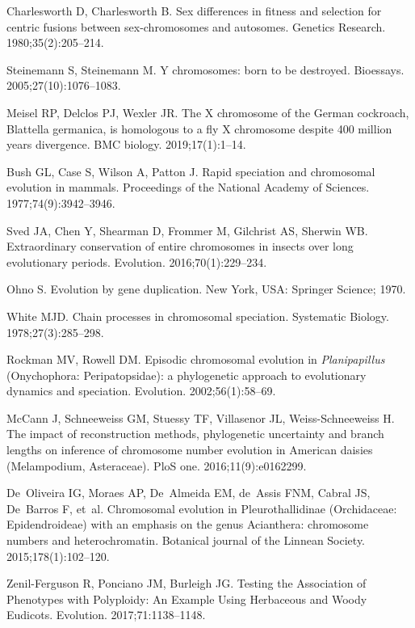 \documentclass[]{rsos}%
\begin{document}
\begin{thebibliography}{9}
Charlesworth D, Charlesworth B.
 Sex differences in fitness and selection for centric fusions between
  sex-chromosomes and autosomes.
 Genetics Research. 1980;35(2):205--214.

Steinemann S, Steinemann M.
 Y chromosomes: born to be destroyed.
 Bioessays. 2005;27(10):1076--1083.

Meisel RP, Delclos PJ, Wexler JR.
 The X chromosome of the German cockroach, Blattella germanica, is
  homologous to a fly X chromosome despite 400 million years divergence.
 BMC biology. 2019;17(1):1--14.

Bush GL, Case S, Wilson A, Patton J.
 Rapid speciation and chromosomal evolution in mammals.
 Proceedings of the National Academy of Sciences.
  1977;74(9):3942--3946.

Sved JA, Chen Y, Shearman D, Frommer M, Gilchrist AS, Sherwin WB.
 Extraordinary conservation of entire chromosomes in insects over long
  evolutionary periods.
 Evolution. 2016;70(1):229--234.

Ohno S.
 Evolution by gene duplication.
 New York, USA: Springer Science; 1970.

White MJD.
 Chain processes in chromosomal speciation.
 Systematic Biology. 1978;27(3):285--298.

Rockman MV, Rowell DM.
 Episodic chromosomal evolution in \emph{{P}lanipapillus}
  ({O}nychophora: {P}eripatopsidae): a phylogenetic approach to evolutionary
  dynamics and speciation.
 Evolution. 2002;56(1):58--69.

McCann J, Schneeweiss GM, Stuessy TF, Villasenor JL, Weiss-Schneeweiss H.
 The impact of reconstruction methods, phylogenetic uncertainty and
  branch lengths on inference of chromosome number evolution in American
  daisies (Melampodium, Asteraceae).
 PloS one. 2016;11(9):e0162299.

De~Oliveira IG, Moraes AP, De~Almeida EM, de~Assis FNM, Cabral JS, De~Barros F,
  et~al.
 Chromosomal evolution in Pleurothallidinae (Orchidaceae:
  Epidendroideae) with an emphasis on the genus Acianthera: chromosome numbers
  and heterochromatin.
 Botanical journal of the Linnean Society. 2015;178(1):102--120.

Zenil-Ferguson R, Ponciano JM, Burleigh JG.
 Testing the Association of Phenotypes with Polyploidy: An Example
  Using Herbaceous and Woody Eudicots.
 Evolution. 2017;71:1138--1148.


\end{thebibliography}
\end{document}
